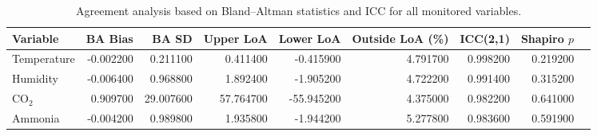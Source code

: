 \begin{table}
\caption{Agreement analysis based on Bland--Altman statistics and ICC for all monitored variables.}
\label{tab:agreement_metrics}
\begin{tabular}{lrrrrrrrr}
\toprule
Variable & BA Bias & BA SD & Upper LoA & Lower LoA & Outside LoA (\%) & ICC(2,1) & Shapiro $p$ \\
\midrule
Temperature & -0.002200 & 0.211100 & 0.411400 & -0.415900 & 4.791700 & 0.998200 & 0.219200 \\
Humidity & -0.006400 & 0.968800 & 1.892400 & -1.905200 & 4.722200 & 0.991400 & 0.315200 \\
CO$_2$ & 0.909700 & 29.007600 & 57.764700 & -55.945200 & 4.375000 & 0.982200 & 0.641000 \\
Ammonia & -0.004200 & 0.989800 & 1.935800 & -1.944200 & 5.277800 & 0.983600 & 0.591900 \\
\bottomrule
\end{tabular}
\end{table}
